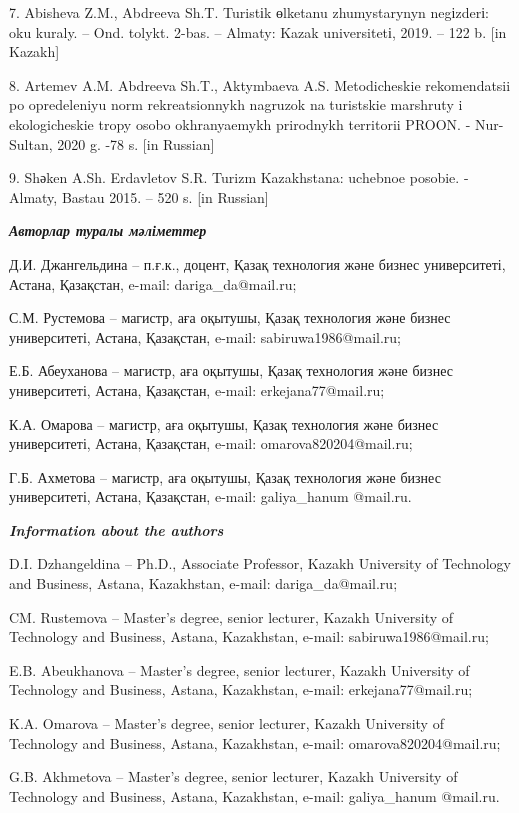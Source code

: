 7. Abisheva Z.M., Abdreeva Sh.T. Turistіk өlketanu zhumystarynyn
negіzderі: oku kuraly. -- Ond. tolykt. 2-bas. -- Almaty: Kazak
universitetі, 2019. -- 122 b. {[}in Kazakh{]}

8. Artem\textquotesingle ev A.M. Abdreeva Sh.T., Aktymbaeva A.S.
Metodicheskie rekomendatsii po opredeleniyu norm rekreatsionnykh
nagruzok na turistskie marshruty i ekologicheskie tropy osobo
okhranyaemykh prirodnykh territorii PROON. - Nur-Sultan, 2020 g. -78 s.
{[}in Russian{]}

9. Shәken A.Sh. Erdavletov S.R. Turizm Kazakhstana: uchebnoe posobie. -
Almaty, Bastau 2015. -- 520 s. {[}in Russian{]}

\emph{{\bfseries Авторлар туралы мәліметтер}}

Д.И. Джангельдина -- п.ғ.к., доцент, Қазақ технология және бизнес
университеті, Астана, Қазақстан, e-mail: dariga\_da@mail.ru;

С.М. Рустемова -- магистр, аға оқытушы, Қазақ технология және бизнес
университеті, Астана, Қазақстан, e-mail: sabiruwa1986@mail.ru;

Е.Б. Абеуханова -- магистр, аға оқытушы, Қазақ технология және бизнес
университеті, Астана, Қазақстан, e-mail: erkejana77@mail.ru;

К.А. Омарова -- магистр, аға оқытушы, Қазақ технология және бизнес
университеті, Астана, Қазақстан, e-mail: omarova820204@mail.ru;

Г.Б. Ахметова -- магистр, аға оқытушы, Қазақ технология және бизнес
университеті, Астана, Қазақстан, e-mail: galiya\_hanum @mail.ru.

\emph{{\bfseries Information about the authors}}

D.I. Dzhangeldina -- Ph.D., Associate Professor, Kazakh University of
Technology and Business, Astana, Kazakhstan, e-mail: dariga\_da@mail.ru;

CM. Rustemova -- Master's degree, senior lecturer, Kazakh University of
Technology and Business, Astana, Kazakhstan, e-mail:
sabiruwa1986@mail.ru;

E.B. Abeukhanova -- Master's degree, senior lecturer, Kazakh University
of Technology and Business, Astana, Kazakhstan, e-mail:
erkejana77@mail.ru;

K.A. Omarova -- Master's degree, senior lecturer, Kazakh University of
Technology and Business, Astana, Kazakhstan, e-mail:
omarova820204@mail.ru;

G.B. Akhmetova -- Master's degree, senior lecturer, Kazakh University of
Technology and Business, Astana, Kazakhstan, e-mail: galiya\_hanum
@mail.ru.

